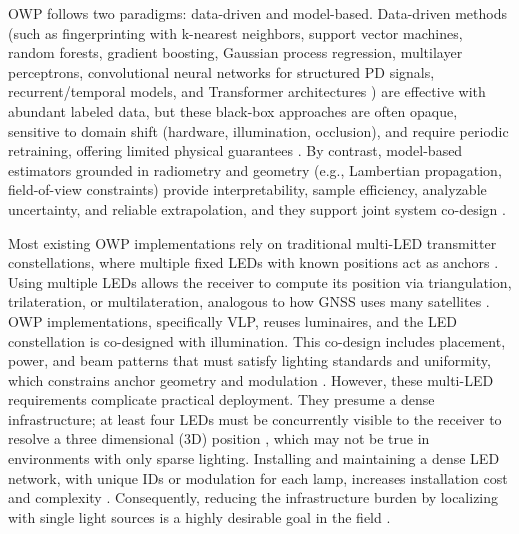 \documentclass[journal]{IEEEtran}
\begin{document}
OWP follows two paradigms: data-driven and model-based.
Data-driven methods (such as fingerprinting with k-nearest neighbors, support vector machines, random forests, gradient boosting, Gaussian process regression, multilayer perceptrons, convolutional neural networks for structured PD signals, recurrent/temporal models, and Transformer architectures \cite{Rekkas2023, Tran2022}) are effective with abundant labeled data, but these black-box approaches are often opaque, sensitive to domain shift (hardware, illumination, occlusion), and require periodic retraining, offering limited physical guarantees \cite{Glass2021}. 
By contrast, model-based estimators grounded in radiometry and geometry (e.g., Lambertian propagation, field-of-view constraints) provide interpretability, sample efficiency, analyzable uncertainty, and reliable extrapolation, and they support joint system co-design \cite{Deng2023}.



Most existing OWP implementations rely on traditional multi-LED transmitter constellations, where multiple fixed LEDs with known positions act as anchors \cite{Zhuang2018}. Using multiple LEDs allows the receiver to compute its position via triangulation, trilateration, or multilateration, analogous to how GNSS uses many satellites \cite{Wang2024b}. 
OWP implementations, specifically VLP, reuses luminaires, and the LED constellation is co-designed with illumination. This co-design includes placement, power, and beam patterns that must satisfy lighting standards and uniformity, which constrains anchor geometry and modulation \cite{photonics9100750}.
However, these multi-LED requirements complicate practical deployment. They presume a dense infrastructure; at least four LEDs must be concurrently visible to the receiver to resolve a three dimensional (3D) position \cite{Plets2019,electronics8111311, ALMADANI2021126654,Zhang2020}, which may not be true in environments with only sparse lighting. Installing and maintaining a dense LED network, with unique IDs or modulation for each lamp, increases installation cost and complexity \cite{Cossu2022}. 
Consequently, reducing the infrastructure burden by localizing with single light sources is a highly desirable goal in the field \cite{Rekkas2023}.
\end{document}
